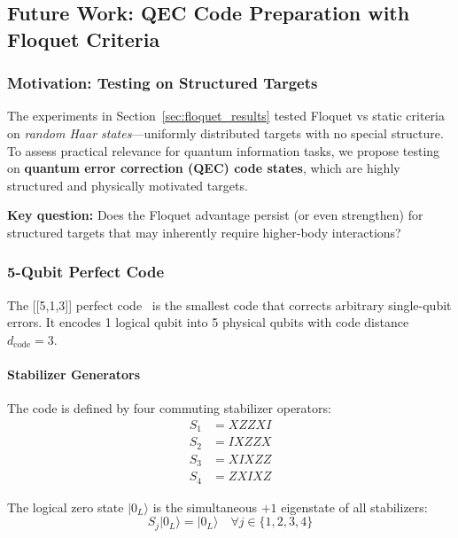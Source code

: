
\subsection{Future Work: QEC Code Preparation with Floquet Criteria}
\label{sec:future_floquet}

\subsubsection{Motivation: Testing on Structured Targets}

The experiments in Section~\ref{sec:floquet_results} tested Floquet vs static criteria on \emph{random Haar states}—uniformly distributed targets with no special structure. To assess practical relevance for quantum information tasks, we propose testing on \textbf{quantum error correction (QEC) code states}, which are highly structured and physically motivated targets.

\textbf{Key question:} Does the Floquet advantage persist (or even strengthen) for structured targets that may inherently require higher-body interactions?

\subsubsection{5-Qubit Perfect Code}

The [[5,1,3]] perfect code~\cite{Laflamme_1996} is the smallest code that corrects arbitrary single-qubit errors. It encodes 1 logical qubit into 5 physical qubits with code distance $d_{\text{code}}=3$.

\paragraph{Stabilizer Generators}

The code is defined by four commuting stabilizer operators:
\begin{align}
S_1 &= X Z Z X I \\
S_2 &= I X Z Z X \\
S_3 &= X I X Z Z \\
S_4 &= Z X I X Z
\end{align}

The logical zero state $|0_L\rangle$ is the simultaneous $+1$ eigenstate of all stabilizers:
\begin{equation}
S_j |0_L\rangle = |0_L\rangle \quad \forall j \in \{1,2,3,4\}
\end{equation}

